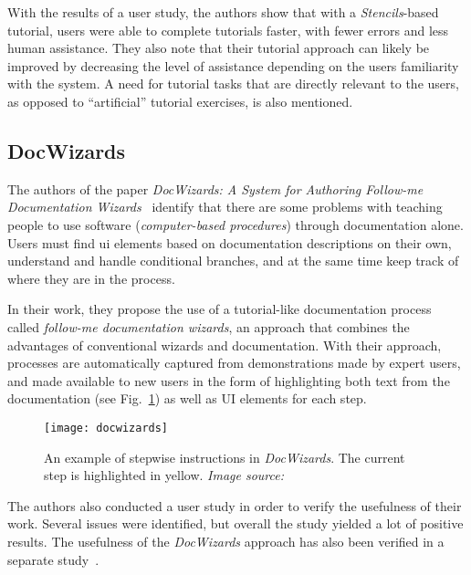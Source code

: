 \noindent
With the results of a user study, the authors show that with a \emph{Stencils}-based tutorial, users were able to complete tutorials faster, with fewer errors and less human assistance. They also note that their tutorial approach can likely be improved by decreasing the level of assistance depending on the users familiarity with the system. A need for tutorial tasks that are directly relevant to the users, as opposed to ``artificial'' tutorial exercises, is also mentioned.


\subsection{DocWizards}
\label{sec:docwizards}
The authors of the paper \emph{DocWizards: A System for Authoring Follow-me Documentation Wizards}~\cite{bergman:docwizards} identify that there are some problems with teaching people to use software (\emph{computer-based procedures}) through documentation alone. Users must find \gls{ui} elements based on documentation descriptions on their own, understand and handle conditional branches, and at the same time keep track of where they are in the process.

\noindent
In their work, they propose the use of a tutorial-like documentation process called \emph{follow-me documentation wizards}, an approach that combines the advantages of conventional wizards and documentation. With their approach, processes are automatically captured from demonstrations made by expert users, and made available to new users in the form of highlighting both text from the documentation (see Fig.~\ref{fig:docwizards}) as well as UI elements for each step.

\begin{figure}[htp]
	\centering
	\texttt{[image: docwizards]}
	\caption[\emph{DocWizards} example]{An example of stepwise instructions in \emph{DocWizards}. The current step is highlighted in yellow. \emph{Image source:~\cite{bergman:docwizards}}}
	\label{fig:docwizards}
\end{figure}

\noindent
The authors also conducted a user study in order to verify the usefulness of their work. Several issues were identified, but overall the study yielded a lot of positive results. The usefulness of the \emph{DocWizards} approach has also been verified in a separate study~\cite{gweon:evaluating_docwizards}.

